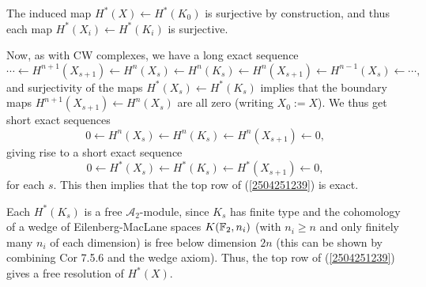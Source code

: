 \documentclass{MetricNotes2023}
\def\bb{\ensuremath\mathbb}
\def\A{\ensuremath{\mathscr{A}_2}}
\begin{document}
The induced map \(H^*(X)\leftarrow H^*(K_0)\) is surjective by construction, and thus each map \(H^*(X_i)\leftarrow H^*(K_i)\) is surjective. 

Now, as with CW complexes, we have a long exact sequence
\[\cdots \leftarrow H^{n+1}(X_{s+1})\leftarrow H^n(X_{s})\leftarrow H^n(K_s)\leftarrow H^n(X_{s+1})\leftarrow H^{n-1}(X_s)\leftarrow \cdots,\]
and surjectivity of the maps \(H^*(X_s)\leftarrow H^*(K_s)\) implies that the boundary maps \(H^{n+1}(X_{s+1})\leftarrow H^n(X_s)\) are all zero (writing \(X_0:=X\)). We thus get short exact sequences
\[0\leftarrow H^n(X_{s})\leftarrow H^n(K_s)\leftarrow H^n(X_{s+1})\leftarrow0,\]
giving rise to a short exact sequence
\[0\leftarrow H^*(X_{s})\leftarrow H^*(K_s)\leftarrow H^*(X_{s+1})\leftarrow0,\]
for each \(s\). This then implies that the top row of (\ref{2504251239}) is exact.

Each \(H^*(K_s)\) is a free \(\A\)-module, since \(K_s\) has finite type and the cohomology of a wedge of Eilenberg-MacLane spaces \(K(\bb{F}_2, n_i)\) (with \(n_i \geq n\) and only finitely many \(n_i\) of each dimension) is free below dimension \(2n\) (this can be shown by combining \autocite{rognes2} Cor 7.5.6 and the wedge axiom). Thus, the top row of (\ref{2504251239}) gives a free resolution of \(H^*(X)\). 

\end{document}
